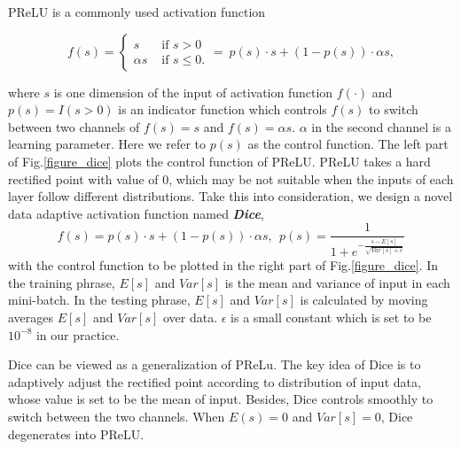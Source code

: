 


PReLU \cite{ms:prelu} is a commonly used activation function
\begin{small}
\begin{equation}
f(s) = \begin{cases}
       s & \text{ if } s > 0  \\
       \alpha s & \text{ if } s \leq 0.
       \end{cases}
     = ~ p(s) \cdot s + (1-p(s))\cdot \alpha s,   
\end{equation}
\end{small}
where $s$ is one dimension of the input of activation function $f(\cdot)$ and $p(s) = I(s>0)$ is an indicator function which controls $f(s)$ to switch between two channels of $f(s)=s$ and $f(s)=\alpha s$. $\alpha$ in the second channel is a learning parameter. 
Here we refer to $p(s)$ as the control function. The left part of Fig.\ref{figure_dice} plots the control function of PReLU.
PReLU takes a hard rectified point with value of $0$, which may be not suitable when the inputs of each layer follow different distributions. 
Take this into consideration, we design a novel data adaptive activation function named \textsl{\textbf{Dice}},
\begin{equation}
f(s) = p(s) \cdot s + (1-p(s))\cdot \alpha s, \ \ p(s) = \frac{1}{ 1 + e^{- \frac{s - E[s]}{\sqrt{Var[s] + \epsilon}}}}
\end{equation}
with the control function to be plotted in the right part of Fig.\ref{figure_dice}.
In the training phrase, $E[s]$ and $Var[s]$ is the mean and variance of input in each mini-batch.  
In the testing phrase, $E[s]$ and $Var[s]$ is calculated by moving averages $E[s]$ and $Var[s]$ over data. 
$\epsilon$ is a small constant which is set to be $10^{-8}$ in our practice.

Dice can be viewed as a generalization of PReLu.
The key idea of Dice is to adaptively adjust the rectified point according to distribution of input data, whose value is set to be the mean of input.
Besides, Dice controls smoothly to switch between the two channels. 
When $E(s)=0$ and $Var[s]=0$, Dice degenerates into PReLU. 




